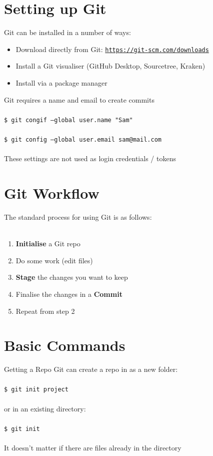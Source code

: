 \documentclass{beamer}
\begin{document}
\section{Setting up Git}
\begin{frame}[allowframebreaks]{\secname}
    Git can be installed in a number of ways:
    \begin{itemize}
        \item Download directly from Git: {\tt \url{https://git-scm.com/downloads}}
        \item Install a Git visualiser (GitHub Desktop, Sourcetree, Kraken)
        \item Install via a package manager 
    \end{itemize}

\framebreak
    
    Git requires a name and email to create commits \\~\\
    {\tt \$ git congif --global user.name "Sam"} \\~\\
    {\tt \$ git config --global user.email sam@mail.com} \\~\\
    These settings are not used as login credentials / tokens
\end{frame}

\section{Git Workflow}
\begin{frame}{\secname}
    The standard process for using Git is as follows: \\~\\
    \begin{enumerate}
        \item {\bf Initialise} a Git repo
        \item Do some work (edit files)
        \item {\bf Stage} the changes you want to keep
        \item Finalise the changes in a {\bf Commit}
        \item Repeat from step 2
    \end{enumerate}
\end{frame}

\section{Basic Commands}
\begin{frame}{Getting a Repo}
    Git can create a repo in as a new folder:\\~\\
    {\tt \$ git init project} \\~\\
    or in an existing directory: \\~\\
    {\tt \$ git init} \\~\\
    It doesn't matter if there are files already in the directory
\end{frame}
\end{document}
